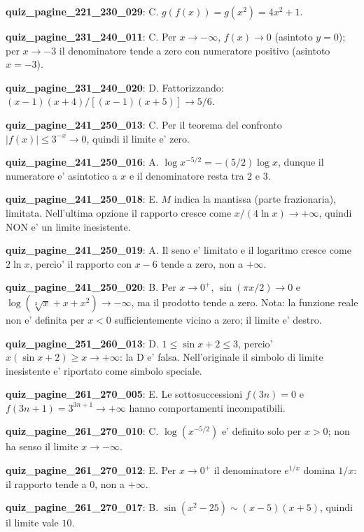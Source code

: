 \documentclass[11pt,a4paper]{article}
\newcounter{quiz}
\begin{document}
\noindent\textbf{quiz\_pagine\_221\_230\_029}: C. $g(f(x))=g(x^2)=4x^2+1$.\par\medskip
\noindent\textbf{quiz\_pagine\_231\_240\_011}: C. Per $x\to-\infty$, $f(x)\to0$ (asintoto $y=0$); per $x\to-3$ il denominatore tende a zero con numeratore positivo (asintoto $x=-3$).\par\medskip
\noindent\textbf{quiz\_pagine\_231\_240\_020}: D. Fattorizzando: $(x-1)(x+4)/[(x-1)(x+5)]\to5/6$.\par\medskip
\noindent\textbf{quiz\_pagine\_241\_250\_013}: C. Per il teorema del confronto $|f(x)|\leq3^{-x}\to0$, quindi il limite e' zero.\par\medskip
\noindent\textbf{quiz\_pagine\_241\_250\_016}: A. $\log x^{-5/2}=-(5/2)\log x$, dunque il numeratore e' asintotico a $x$ e il denominatore resta tra 2 e 3.\par\medskip
\noindent\textbf{quiz\_pagine\_241\_250\_018}: E. $M$ indica la mantissa (parte frazionaria), limitata. Nell'ultima opzione il rapporto cresce come $x/(4\ln x)\to+\infty$, quindi NON e' un limite inesistente.\par\medskip
\noindent\textbf{quiz\_pagine\_241\_250\_019}: A. Il seno e' limitato e il logaritmo cresce come $2\ln x$, percio' il rapporto con $x-6$ tende a zero, non a $+\infty$.\par\medskip
\noindent\textbf{quiz\_pagine\_241\_250\_020}: B. Per $x\to0^+$, $\sin(\pi x/2)\to0$ e $\log(\sqrt[3]x+x+x^2)\to-\infty$, ma il prodotto tende a zero. Nota: la funzione reale non e' definita per $x<0$ sufficientemente vicino a zero; il limite e' destro.\par\medskip
\noindent\textbf{quiz\_pagine\_251\_260\_013}: D. $1\leq\sin x+2\leq3$, percio' $x(\sin x+2)\geq x\to+\infty$: la D e' falsa. Nell'originale il simbolo di limite inesistente e' riportato come simbolo speciale.\par\medskip
\noindent\textbf{quiz\_pagine\_261\_270\_005}: E. Le sottosuccessioni $f(3n)=0$ e $f(3n+1)=3^{3n+1}\to+\infty$ hanno comportamenti incompatibili.\par\medskip
\noindent\textbf{quiz\_pagine\_261\_270\_010}: C. $\log(x^{-5/2})$ e' definito solo per $x>0$; non ha senso il limite $x\to-\infty$.\par\medskip
\noindent\textbf{quiz\_pagine\_261\_270\_012}: E. Per $x\to0^+$ il denominatore $e^{1/x}$ domina $1/x$: il rapporto tende a $0$, non a $+\infty$.\par\medskip
\noindent\textbf{quiz\_pagine\_261\_270\_017}: B. $\sin(x^2-25)\sim(x-5)(x+5)$, quindi il limite vale $10$.\par\medskip
\end{document}
